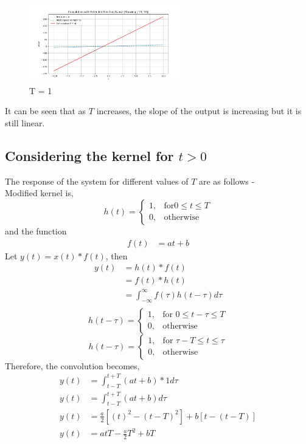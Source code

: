 \begin{figure}[h]
    \centering
    \includegraphics[width=0.6\textwidth]{figsm/2.png}
    \caption{T = 1}
    \label{fig:conv_sinc}
\end{figure}
It can be seen that as $T$ increases, the slope of the output is increasing but it is still linear.
\newpage
\subsection{Considering the kernel for $t>0$}
The response of the system for different values of $T$ are as follows -\\
Modified kernel is, 
\[
h(t) =
\begin{cases}
1, & \text{for} 0 \leq t \leq T \\
0, & \text{otherwise}
\end{cases}
\]
and the function 
\begin{align*}
f(t) &= at+b
\end{align*}
Let $y(t) = x(t) * f(t)$, then
\begin{align*}
	y(t) &= h(t) * f(t) \\
             &= f(t) * h(t) \\
             &= \int_{-\infty}^{\infty} f(\tau) h(t - \tau) d \tau \\
\end{align*}
\[
h(t - \tau) =
\begin{cases}
1, & \text{for } 0 \leq t - \tau \leq T \\
0, & \text{otherwise}
\end{cases}
\]
\[
h(t - \tau) =
\begin{cases}
1, & \text{for } \tau - T \leq t \leq \tau \\
0, & \text{otherwise}
\end{cases}
\]
Therefore, the convolution becomes, 
\begin{align*}
	y(t) &= \int_{t - T}^{t + T} (at+b)* 1 d\tau \\
	y(t) &= \int_{t - T}^{t + T}  (at+b)d\tau\\
    y(t) &= \frac{a}{2}[(t)^2-(t-T)^2]+b[t-(t-T)]\\
    y(t) &= atT-\frac{a}{2}{T}^2+bT
\end{align*}
